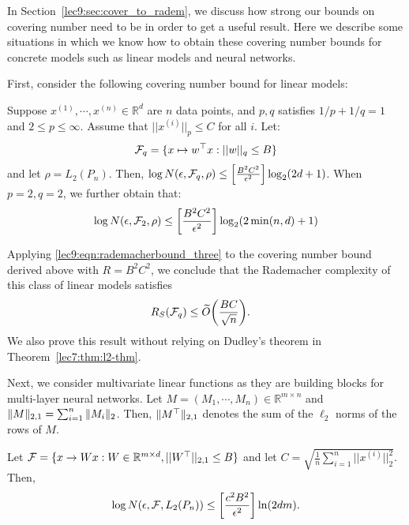 \label{sec:deep_nets}
In Section~\ref{lec9:sec:cover_to_radem}, we discuss how strong our bounds on covering number need to be in order to get a useful result. 
Here we describe some situations in which we know how to obtain these covering number bounds for concrete models such as linear models and neural networks. 

First, consider the following covering number bound for linear models:

\begin{theorem} \label{lec9:thm:univariate_rad}
Suppose $x^{(1)}, \cdots, x^{(n)} \in \mathbb{R}^d$ are $n$ data points, and $p, q$ satisfies $1/p + 1/q = 1$ and $2 \le p \le \infty$. Assume that $||x^{(i)}||_p \le C$ for all $i$. Let:
\begin{align}
    \mathcal F_q = \{x \mapsto w^\top x : ||w||_q \le B\}
\end{align}
and let $\rho = L_2(P_n)$. Then, $\log N(\epsilon, \mathcal F_q, \rho) \le \left [\frac{B^2C^2}{\epsilon^2}\right ] \log_2 (2d + 1)$. When $p = 2, q = 2$, we further obtain that:
\begin{align}
    \log N(\epsilon, \mathcal F_2, \rho) \le \left [\frac{B^2C^2}{\epsilon^2} \right ] \log_2 (2 \min (n, d ) + 1)
\end{align}
\end{theorem}
\begin{remark}
Applying \eqref{lec9:eqn:rademacherbound_three} to the covering number bound derived above with $R = B^2C^2$, we conclude that the Rademacher complexity of this class of linear models satisfies
\begin{align}
    R_S(\mathcal F_q) &\le \widetilde{O}{\left( \frac{BC}{\sqrt{n}} \right)}.
\end{align} 
We also prove this result without relying on Dudley's theorem in Theorem~\ref{lec7:thm:l2-thm}.
\end{remark}
Next, we consider multivariate linear functions as they are building blocks for multi-layer neural networks. Let $M = (M_1, \cdots, M_n) \in \mathbb{R}^{m \times n}$ and $\|M\|_{2,1} = \sum_{i = 1}^n \|M_i\|_2$. Then, $\|M^\top\|_{2,1}$ denotes the sum of the $\ell_2$ norms of the rows of $M$. 
\begin{theorem}\label{lec9:thm:multivariate_rad}
Let $\mathcal F = \{x \to Wx : W \in \mathbb{R}^{m \times d}, ||W^\top||_{2, 1} \le B\}$ and let $C = \sqrt{\frac{1}{n} \sum_{i = 1}^n ||x^{(i)}||_2^2}$. Then, 
\begin{equation}
\log N(\epsilon, \mathcal F, L_2(P_n)) \le \left [\frac{c^2B^2}{\epsilon^2} \right ] \ln (2dm).
\end{equation}
\end{theorem}
